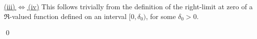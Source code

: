 \vskip 0.5cm
\noindent
\underline{(iii)\,$\Longleftrightarrow$\,(iv)}
\vskip 0.1cm
\noindent
This follows trivially from the definition of the right-limit at zero of a $\Re$-valued function defined
on an interval $[0,\delta_{0})$, for some $\delta_{0} > 0$.

\qed
